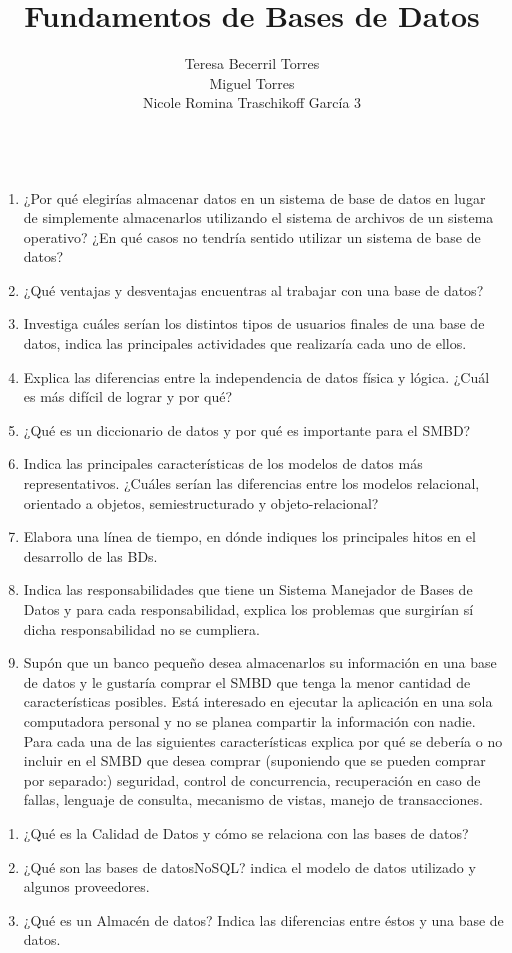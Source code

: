 \documentclass{article}
\title{Fundamentos de Bases de Datos}
\author{Teresa Becerril Torres\\
            Miguel Torres\\
            Nicole Romina Traschikoff García 3\\
            \\}
\begin{document}
        \maketitle
        \vspace{.4cm}
        \begin{enumerate}
          \item ¿Por qué elegirías almacenar datos en un sistema de base de datos en lugar de simplemente almacenarlos utilizando el sistema de archivos de un sistema operativo? ¿En qué casos no tendría sentido utilizar un sistema de base de datos?
          \item ¿Qué ventajas y desventajas encuentras al trabajar con una base de datos?
          \item Investiga cuáles serían los distintos tipos de usuarios finales de una base de datos, indica las principales actividades que realizaría cada uno de ellos.
          \item Explica las diferencias entre la independencia de datos física y lógica. ¿Cuál es más difícil de lograr y por qué?
          \item ¿Qué es un diccionario de datos y por qué es importante para el SMBD?
          \item Indica las principales características de los modelos de datos más representativos. ¿Cuáles serían las diferencias entre los modelos relacional, orientado a objetos, semiestructurado y objeto-relacional?
          \item Elabora una línea de tiempo, en dónde indiques los principales hitos en el desarrollo de las BDs.
          \item Indica las responsabilidades que tiene un Sistema Manejador de Bases de Datos y para cada responsabilidad, explica los problemas que surgirían sí dicha responsabilidad no se cumpliera.
          \item Supón que un banco pequeño desea almacenarlos su información en una base de datos y le gustaría comprar el SMBD que tenga la menor cantidad de características posibles. Está interesado en ejecutar la aplicación en una sola computadora personal y no se planea compartir la información con nadie. Para cada una de las siguientes características explica por qué se debería o no incluir en el SMBD que desea comprar (suponiendo que se pueden comprar por separado:) seguridad, control de concurrencia, recuperación en caso de fallas, lenguaje de consulta, mecanismo de vistas, manejo de transacciones.
          \end{enumerate} 

          \begin{enumerate}

          \item ¿Qué es la Calidad de Datos y cómo se relaciona con las bases de datos?
          \item ¿Qué son las bases de datosNoSQL? indica el modelo de datos utilizado y algunos proveedores.
          \item ¿Qué es un Almacén de datos? Indica las diferencias entre éstos y una base de datos.

          \end{enumerate}

    
\end{document}
